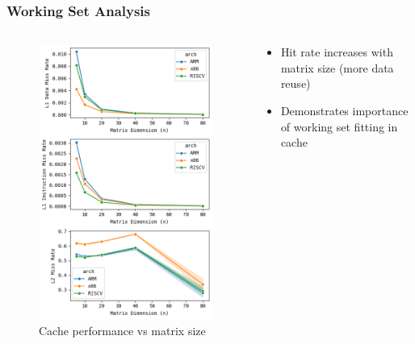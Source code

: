 \begin{frame}
	\frametitle{Working Set Analysis}
	\begin{columns}
		\begin{column}{0.45\linewidth}
			\begin{figure}[h]
				\centering
				\includegraphics[width=0.5\linewidth]{images/dim_cache.png}
				\caption{Cache performance vs matrix size}
			\end{figure}
		\end{column}
		\begin{column}{0.4\linewidth}
			\begin{itemize}
				\item Hit rate increases with matrix size (more data reuse)
				\item Demonstrates importance of working set fitting in cache
			\end{itemize}
		\end{column}
	\end{columns}
\end{frame}
